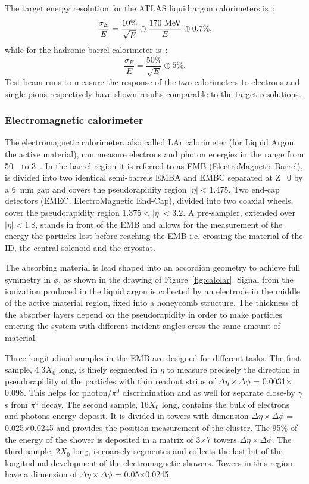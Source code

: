 The target energy resolution for the ATLAS liquid argon calorimeters is~\cite{lar_readiness}:
\begin{equation}
\frac{\sigma_{E}}{E}=\frac{10\%}{\sqrt{E}} \oplus\frac{170\MeV}{E} \oplus 0.7\%,
\end{equation}
while for the hadronic barrel calorimeter is~\cite{tile_readiness}:
\begin{equation}
\frac{\sigma_{E}}{E}=\frac{50\%}{\sqrt{E}} \oplus 5\%.
\end{equation}
Test-beam runs to measure the response of the two calorimeters to electrons
and single pions respectively have shown results comparable to the target resolutions.


\subsubsection{Electromagnetic calorimeter}\label{sec:emcalbarrel}

The electromagnetic calorimeter, also called LAr calorimeter 
(for Liquid Argon, the active material),
can measure electrons and photon energies in the range from 50~\mev\ to 3~\tev.
In the barrel region it is referred to as EMB (ElectroMagnetic Barrel), is 
divided into two identical semi-barrels EMBA and EMBC separated at Z=0 by a 6~mm
gap and covers the pseudorapidity region $|\eta|<1.475$. 
Two end-cap detectors (EMEC, ElectroMagnetic End-Cap), divided 
into two coaxial wheels, cover the pseudorapidity 
region $1.375<|\eta|<3.2$. A pre-sampler, extended over 
$|\eta|<1.8$, stands in front of the EMB and allows for the measurement of
the energy the particles lost before reaching the EMB i.e. crossing the
material of the ID, the central solenoid and the cryostat.

The absorbing material is lead shaped into an accordion geometry to achieve
full symmetry in $\phi$, as shown in the drawing of Figure~\ref{fig:calolar}.
Signal from the ionization produced in the liquid argon is collected
by an electrode in the middle of the active material region, fixed into
a honeycomb structure.
The thickness of the absorber layers depend on the pseudorapidity in
order to make particles entering the system with different incident 
angles cross the same amount of material.

Three longitudinal samples in the EMB are designed for different tasks. The first
sample, 4.3$X_0$ long, is finely segmented in $\eta$ to measure precisely
the direction in pseudorapidity of the particles with  thin readout strips
of $\Delta\eta\times\Delta\phi$ = 0.0031$\times$0.098. This helps for
photon/$\pi^{0}$ discrimination and as well for separate close-by $\gamma$s
from $\pi^{0}$ decay.
The second sample, 16$X_0$ long, contains the bulk of electrons and photons energy deposit. 
It is divided in towers with dimension $\Delta\eta\times\Delta\phi$ = 0.025$\times$0.0245
and provides the position measurement of the cluster. 
The  95\% of the energy of the shower is deposited in a matrix of 3$\times$7 
towers $\Delta\eta\times\Delta\phi$.
The third sample, 2$X_0$ long, is coarsely segmentes and collects the last bit of the longitudinal
development of the electromagnetic showers. Towers in this region have a dimension
of $\Delta\eta\times\Delta\phi$ = 0.05$\times$0.0245.

